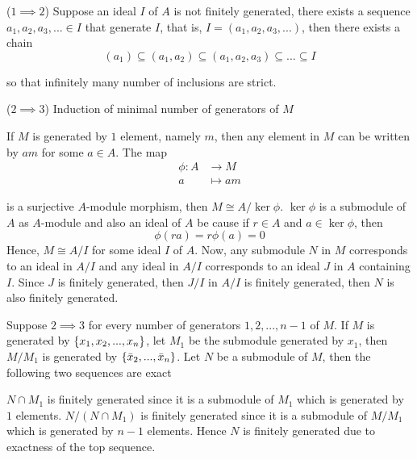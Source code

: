 \begin{longproof}
	($1 \implies 2$) Suppose an ideal $I$ of $A$ is not finitely generated, there exists a sequence $a_1, a_2, a_3, ... \in I$ that generate $I$, that is, $I = (a_1, a_2, a_3, ...)$, then there exists a chain
	$$
	(a_1) \subseteq (a_1, a_2) \subseteq (a_1, a_2, a_3) \subseteq ... \subseteq I
	$$
	
	so that infinitely many number of inclusions are strict.
	
	($2 \implies 3$) Induction of minimal number of generators of $M$
	
	If $M$ is generated by $1$ element, namely $m$, then any element in $M$ can be written by $am$ for some $a \in A$. The map 
	\begin{align*}
		\phi: A &\to M \\
		a &\mapsto am
	\end{align*}
	
	is a surjective $A$-module morphism, then $M \cong A / \ker \phi$. $\ker \phi$ is a submodule of $A$ as $A$-module and also an ideal of $A$ be cause if $r \in A$ and $a \in \ker \phi$, then 
	$$
	\phi(ra) = r \phi(a) = 0
	$$
	Hence, $M \cong A / I$ for some ideal $I$ of $A$. Now, any submodule $N$ in $M$ corresponds to an ideal in $A / I$ and any ideal in $A / I$ corresponds to an ideal $J$ in $A$ containing $I$. Since $J$ is finitely generated, then $J / I$ in $A / I$ is finitely generated, then $N$ is also finitely generated.	
	
	Suppose $2 \implies 3$ for every number of generators $1, 2, ..., n-1$ of $M$. If $M$ is generated by $\{x_1, x_2, ..., x_n\}$, let $M_1$ be the submodule generated by $x_1$, then $M / M_1$ is generated by $\{\bar{x}_2, ..., \bar{x}_n\}$. Let $N$ be a submodule of $M$, then the following two sequences are exact
	\begin{center}
	\end{center}
	
	$N \cap M_1$ is finitely generated since it is a submodule of $M_1$ which is generated by $1$ elements. $N / (N \cap M_1)$ is finitely generated since it is a submodule of $M / M_1$ which is generated by $n-1$ elements. Hence $N$ is finitely generated due to exactness of the top sequence.
	

\end{longproof}
